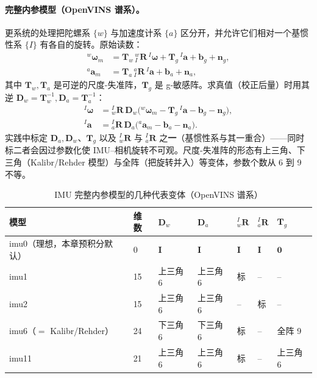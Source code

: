 \paragraph{完整内参模型（OpenVINS 谱系）。}
更系统的处理把陀螺系 $\{w\}$ 与加速度计系 $\{a\}$ 区分开，并允许它们相对一个基惯性系 $\{I\}$ 有各自的旋转\cite{yang2022online}。原始读数：
\begin{align}
  {}^w\boldsymbol\omega_m&=\mathbf T_w\,{}^w_I\mathbf R\,{}^I\boldsymbol\omega+\mathbf T_g\,{}^I\mathbf a+\mathbf b_g+\mathbf n_g, \label{eq:imu-intr-gyro}\\
  {}^a\mathbf a_m&=\mathbf T_a\,{}^a_I\mathbf R\,{}^I\mathbf a+\mathbf b_a+\mathbf n_a, \label{eq:imu-intr-accel}
\end{align}
其中 $\mathbf T_w,\mathbf T_a$ 是可逆的尺度-失准阵，$\mathbf T_g$ 是 g-敏感阵。求真值（校正后量）时用其逆 $\mathbf D_w=\mathbf T_w^{-1},\mathbf D_a=\mathbf T_a^{-1}$：
\begin{align}
  {}^I\boldsymbol\omega&={}^I_w\mathbf R\,\mathbf D_w\big({}^w\boldsymbol\omega_m-\mathbf T_g\,{}^I\mathbf a-\mathbf b_g-\mathbf n_g\big), \label{eq:imu-intr-gyro-inv}\\
  {}^I\mathbf a&={}^I_a\mathbf R\,\mathbf D_a\big({}^a\mathbf a_m-\mathbf b_a-\mathbf n_a\big). \label{eq:imu-intr-accel-inv}
\end{align}
实践中标定 $\mathbf D_a,\mathbf D_w$、$\mathbf T_g$ 以及 ${}^I_w\mathbf R$ 与 ${}^I_a\mathbf R$ 之\textbf{一}（基惯性系与其一重合）——同时标二者会因过参数化使 IMU--相机旋转不可观\cite{yang2022online}。尺度-失准阵的形态有上三角、下三角（Kalibr/Rehder 模型）与全阵（把旋转并入）等变体，参数个数从 6 到 9 不等。

\begin{table}[H]\centering\small
\caption{IMU 完整内参模型的几种代表变体（OpenVINS 谱系\cite{yang2022online}）}
\label{tab:imu-intrinsics}
\begin{tabular}{lllllll}
\toprule
模型 & 维数 & $\mathbf D_w$ & $\mathbf D_a$ & ${}^I_w\mathbf R$ & ${}^I_a\mathbf R$ & $\mathbf T_g$ \\
\midrule
imu0（理想，本章预积分默认）& 0 & $\mathbf I$ & $\mathbf I$ & $\mathbf I$ & $\mathbf I$ & $\mathbf 0$ \\
imu1 & 15 & 上三角 6 & 上三角 6 & 标 & -- & -- \\
imu2 & 15 & 上三角 6 & 上三角 6 & -- & 标 & -- \\
imu6（$=$ Kalibr/Rehder）& 24 & 下三角 6 & 下三角 6 & 标 & -- & 全阵 9 \\
imu11 & 21 & 上三角 6 & 上三角 6 & 标 & -- & 上三角 6 \\
\bottomrule
\end{tabular}
\end{table}

